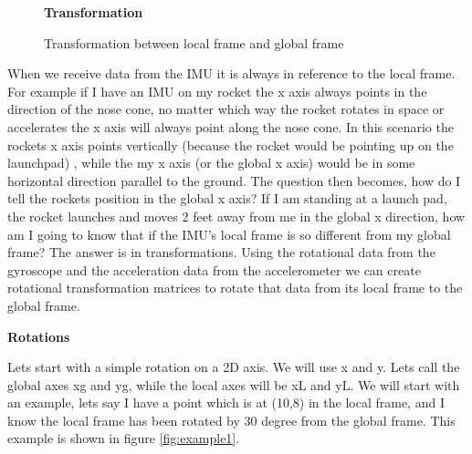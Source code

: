 \documentclass[12pt,letterpaper,boxed]{hmcpset}
\begin{document}
\begin{figure}[H]
	\centering
	\textbf{Transformation}\par\medskip
	\caption{Transformation between local frame and global frame}
	\label{fig:transform}
\end{figure}
When we receive data from the IMU it is always in reference to the local frame. For example if I have an IMU on my rocket the x axis always points in the direction of the nose cone, no matter which way the rocket rotates in space or accelerates the x axis will always point along the nose cone. In this scenario the rockets x axis points vertically (because the rocket would be pointing up on the launchpad) , while the my x axis (or the global x axis) would be in some horizontal direction parallel to the ground. The question then becomes, how do I tell the rockets position in the global x axis? If I am standing at a launch pad, the rocket launches and moves 2 feet away from me in the global x direction, how am I going to know that if the IMU's local frame is so different from my global frame? The answer is in transformations. Using the rotational data from the gyroscope and the acceleration data from the accelerometer we can create rotational transformation matrices to rotate that data from its local frame to the global frame. 

\begin{center}
\textbf{Rotations}
\end{center}
Lets start with a simple rotation on a 2D axis. We will use x and y. Lets call the global axes xg and yg, while the local axes will be xL and yL. We will start with an example, lets say I have a point which is at (10,8) in the local frame, and I know the local frame has been rotated by 30 degree from the global frame. This example is shown in figure \ref{fig:example1}.
\end{document}
